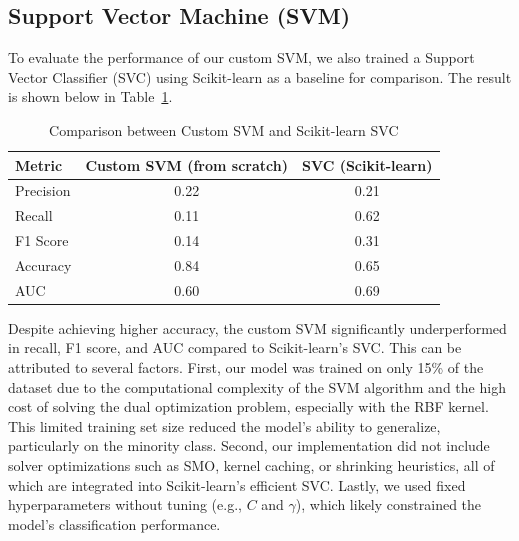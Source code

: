\documentclass[final]{article}
\begin{document}
\subsection{Support Vector Machine (SVM)}
To evaluate the performance of our custom SVM, we also trained a Support Vector Classifier (SVC) using Scikit-learn as a baseline for comparison. The result is shown below in Table~\ref{tab:ehh}. 
\begin{table}[H]
\centering
\caption{Comparison between Custom SVM and Scikit-learn SVC}
\begin{tabular}{lcc}
\toprule
\textbf{Metric} & \textbf{Custom SVM (from scratch)} & \textbf{SVC (Scikit-learn)} \\
\midrule
Precision & 0.22 & 0.21 \\
Recall & 0.11 & 0.62 \\
F1 Score & 0.14 & 0.31 \\
Accuracy & 0.84 & 0.65 \\
AUC & 0.60 & 0.69 \\
\bottomrule
\end{tabular}
\label{tab:ehh}
\end{table}
Despite achieving higher accuracy, the custom SVM significantly underperformed in recall, F1 score, and AUC compared to Scikit-learn’s SVC. This can be attributed to several factors. First, our model was trained on only 15\% of the dataset due to the computational complexity of the SVM algorithm and the high cost of solving the dual optimization problem, especially with the RBF kernel. This limited training set size reduced the model’s ability to generalize, particularly on the minority class. Second, our implementation did not include solver optimizations such as SMO, kernel caching, or shrinking heuristics, all of which are integrated into Scikit-learn's efficient SVC. Lastly, we used fixed hyperparameters without tuning (e.g., \(C\) and \(\gamma\)), which likely constrained the model’s classification performance.
\end{document}
